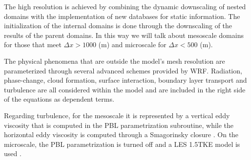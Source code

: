The high resolution is achieved by combining the dynamic downscaling of nested domains with the implementation of new databases for static information. The initialization of the internal domains is done through the downscaling of the results of the parent domains. In this way we will talk about mesoscale domains for those that meet $\Delta x > 1000$ (m) and microscale for $\Delta x < 500$ (m). 

The physical phenomena that are outside the model's mesh resolution are parameterized through several advanced schemes provided by WRF. Radiation, phase-change, cloud formation, surface interaction, boundary layer transport and turbulence are all considered within the model and are included in the right side of the equations as dependent terms.

Regarding turbulence, for the mesoscale it is represented by a vertical eddy viscosity that is computed in the PBL parametrization subroutine, while the horizontal eddy viscosity is computed through a Smagorinsky closure \citep{smagorinsky1963general}. On the microscale, the PBL parametrization is turned off and a LES 1.5TKE  model is used \citep{deardorff1980stratocumulus}.

